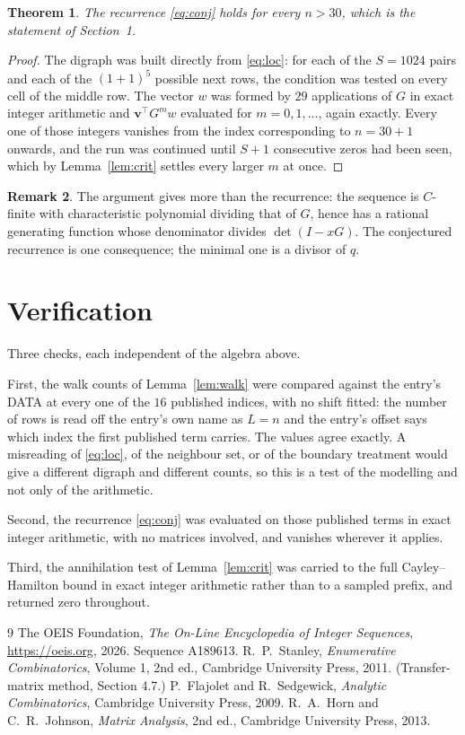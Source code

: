 \documentclass[11pt,a4paper]{article}
\theoremstyle{plain}
\newtheorem{theorem}{Theorem}
\theoremstyle{definition}
\newtheorem{remark}[theorem]{Remark}
\begin{document}
\begin{theorem}
The recurrence \eqref{eq:conj} holds for every $n>30$, which is the statement of
Section~1.
\end{theorem}

\begin{proof}
The digraph was built directly from \eqref{eq:loc}: for each of the $S=1024$ pairs and each
of the $(1+1)^{5}$ possible next rows, the condition was tested on every cell of
the middle row. The vector $w$ was formed by $29$ applications of $G$ in exact integer
arithmetic and $\mathbf{v}^{\!\top}G^{m}w$ evaluated for $m=0,1,\dots$, again exactly.
Every one of those integers vanishes from the index corresponding to $n=30+1$ onwards,
and the run was continued until $S+1$ consecutive zeros had been seen, which by
Lemma~\ref{lem:crit} settles every larger $m$ at once.
\end{proof}

\begin{remark}
The argument gives more than the recurrence: the sequence is $C$-finite with characteristic
polynomial dividing that of $G$, hence has a rational generating function whose denominator
divides $\det(I-xG)$. The conjectured recurrence is one consequence; the minimal one is a
divisor of $q$.
\end{remark}

\section{Verification}

Three checks, each independent of the algebra above.

First, the walk counts of Lemma~\ref{lem:walk} were compared against the entry's DATA at
every one of the $16$ published indices, with no shift fitted: the number of rows is
read off the entry's own name as $L=n$ and the entry's offset says which index the first
published term carries. The values agree exactly. A misreading of \eqref{eq:loc}, of the
neighbour set, or of the boundary treatment would give a different digraph and different
counts, so this is a test of the modelling and not only of the arithmetic.

Second, the recurrence \eqref{eq:conj} was evaluated on those published terms in exact
integer arithmetic, with no matrices involved, and vanishes wherever it applies.

Third, the annihilation test of Lemma~\ref{lem:crit} was carried to the full
Cayley--Hamilton bound in exact integer arithmetic rather than to a sampled prefix, and
returned zero throughout.

\begin{thebibliography}{9}
 The OEIS Foundation, \emph{The On-Line Encyclopedia of Integer
Sequences}, \url{https://oeis.org}, 2026. Sequence A189613.
 R.~P.~Stanley, \emph{Enumerative Combinatorics}, Volume 1, 2nd ed.,
Cambridge University Press, 2011. (Transfer-matrix method, Section 4.7.)
 P.~Flajolet and R.~Sedgewick, \emph{Analytic Combinatorics}, Cambridge
University Press, 2009.
 R.~A.~Horn and C.~R.~Johnson, \emph{Matrix Analysis}, 2nd ed., Cambridge
University Press, 2013.
\end{thebibliography}
\end{document}
